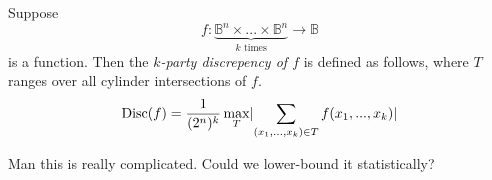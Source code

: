 \begin{definition}
Suppose
\[f : \underbrace{\mathbb{B}^n \times ... \times \mathbb{B}^n}_{k \text{ times}} \to \mathbb{B}\]
is a function.  Then the \emph{$k$-party discrepency of $f$} is defined as follows, where $T$ ranges over all cylinder intersections of $f$.
\[\text{Disc}(f) = \frac{1}{(2^n)^k} \max_T \lvert\sum_{(x_1,...,x_k) \in T} f(x_1,...,x_k)\rvert\]
\end{definition}
\pause
Man this is really complicated.
\pause
Could we lower-bound it statistically?